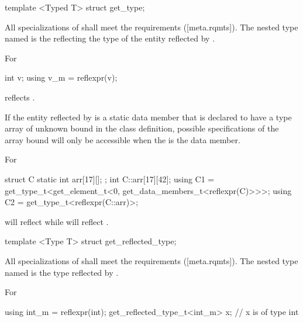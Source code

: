 \begin{std.txt}\color{addclr}

\begin{itemdecl}
template <Typed T> struct get_type;
\end{itemdecl}

\begin{itemdescr}
\pnum
All specializations of  shall meet the  requirements ([meta.rqmts]). The nested type named  is the  reflecting the type of the entity reflected by .

\pnum
\begin{example}
For
\begin{codeblock}
int v; using v_m = reflexpr(v);
\end{codeblock}
 reflects .
\end{example}

\pnum
If the entity reflected by  is a static data member that is declared to have a type array of unknown bound in the class definition, possible specifications of the array bound will only be accessible when the  is the data member.

\pnum
\begin{note}
For
\begin{codeblock}
struct C {
   static int arr[17][];
};
int C::arr[17][42];
using C1 = get_type_t<get_element_t<0, get_data_members_t<reflexpr(C)>>>;
using C2 = get_type_t<reflexpr(C::arr)>;
\end{codeblock}
 will reflect  while  will reflect .
\end{note}

\end{itemdescr}
template <Type T> struct get_reflected_type;
\begin{itemdecl}
\end{itemdecl}

\begin{itemdescr}
\pnum
All specializations of  shall meet the  requirements ([meta.rqmts]). The nested type named  is the type reflected by .

\pnum
\begin{example}
For
\begin{codeblock}
using int_m = reflexpr(int);
get_reflected_type_t<int_m> x; // x is of type int
\end{codeblock}
\end{example}
\end{itemdescr}


\end{std.txt}
